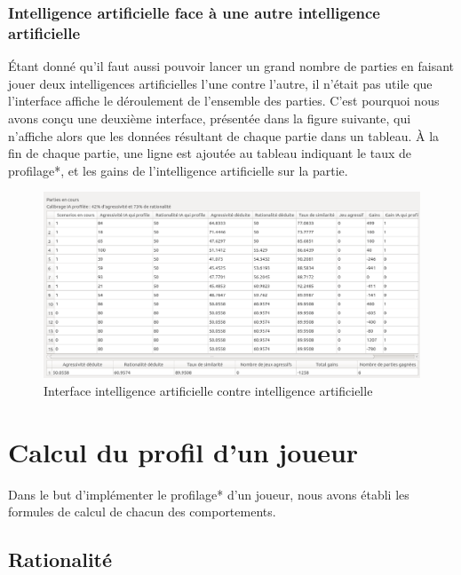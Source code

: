 \documentclass{report}
\begin{document}
\subsection{Intelligence artificielle face à une autre intelligence artificielle}

\hspace{0.5cm}Étant donné qu'il faut aussi pouvoir lancer un grand nombre de parties en faisant jouer deux intelligences artificielles l'une contre l'autre, il n'était pas utile que l'interface affiche le déroulement de l'ensemble des parties. C'est pourquoi nous avons conçu une deuxième interface, présentée dans la figure suivante, qui n'affiche alors que les données résultant de chaque partie dans un tableau. À la fin de chaque partie, une ligne est ajoutée au tableau indiquant le taux de profilage*, et les gains de l'intelligence artificielle sur la partie.\\

\begin{figure}[H]
\hspace{-0.5cm}
		\includegraphics[scale=0.3]{./imagesRapport/interfaceGraphiqueIA.png}
	\caption[Interface intelligence artificielle contre intelligence artificielle]{Interface intelligence artificielle contre intelligence artificielle}
\end{figure}

\chapter{Calcul du profil d'un joueur}


\hspace{0.5cm}Dans le but d'implémenter le profilage* d'un joueur, nous avons établi les formules de calcul de chacun des comportements. \par

\section{Rationalité}
\end{document}
